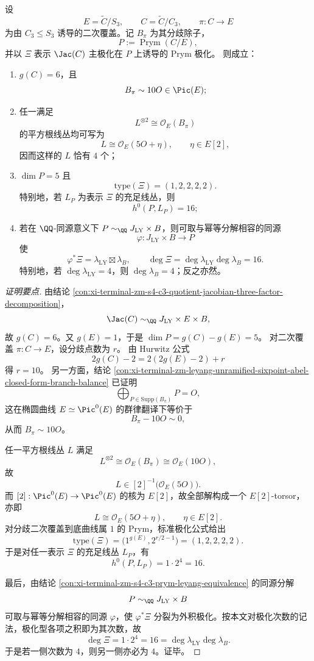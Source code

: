 \begin{conclusion}\label{con:xi-terminal-zm-prym-polarization-type-rigidity-11112}
设
\[
E=\widetilde{C}/S_3,\qquad
C=\widetilde{C}/C_3,\qquad
\pi:C\longrightarrow E
\]
为由 \(C_3\le S_3\) 诱导的二次覆盖。记 \(B_\pi\) 为其分歧除子，
\[
P:=\operatorname{Prym}(C/E),
\]
并以 \(\Xi\) 表示 \(\Jac(C)\) 主极化在 \(P\) 上诱导的 Prym 极化。
则成立：
\begin{enumerate}
  \item \(g(C)=6\)，且
  \[
  B_\pi\sim 10O\in \Pic(E);
  \]
  \item 任一满足
  \[
  L^{\otimes 2}\cong \mathcal O_E(B_\pi)
  \]
  的平方根线丛均可写为
  \[
  L\cong \mathcal O_E(5O+\eta),\qquad \eta\in E[2],
  \]
  因而这样的 \(L\) 恰有 \(4\) 个；
  \item \(\dim P=5\) 且
  \[
  \mathrm{type}(\Xi)=(1,2,2,2,2).
  \]
  特别地，若 \(L_P\) 为表示 \(\Xi\) 的充足线丛，则
  \[
  h^0(P,L_P)=16;
  \]
  \item 若在 \(\QQ\)-同源意义下 \(P\sim_{\QQ}J_{\mathrm{LY}}\times B\)，则可取与幂等分解相容的同源
  \[
  \varphi:J_{\mathrm{LY}}\times B\longrightarrow P
  \]
  使
  \[
  \varphi^*\Xi=\lambda_{\mathrm{LY}}\boxtimes \lambda_B,
  \qquad
  \deg\Xi=\deg\lambda_{\mathrm{LY}}\deg\lambda_B=16.
  \]
  特别地，若 \(\deg\lambda_{\mathrm{LY}}=4\)，则 \(\deg\lambda_B=4\)；反之亦然。
\end{enumerate}
\end{conclusion}
\begin{proof}[证明要点]
由结论 \ref{con:xi-terminal-zm-s4-c3-quotient-jacobian-three-factor-decomposition}，
\[
\Jac(C)\sim_{\QQ}J_{\mathrm{LY}}\times E\times B,
\]
故 \(g(C)=6\)。又 \(g(E)=1\)，于是 \(\dim P=g(C)-g(E)=5\)。
对二次覆盖 \(\pi:C\to E\)，设分歧点数为 \(r\)。
由 Hurwitz 公式
\[
2g(C)-2=2(2g(E)-2)+r
\]
得 \(r=10\)。
另一方面，结论 \ref{con:xi-terminal-zm-leyang-unramified-sixpoint-abel-closed-form-branch-balance} 已证明
\[
\bigoplus_{P\in\mathrm{Supp}(B_\pi)}P=O,
\]
这在椭圆曲线 \(E\simeq \Pic^0(E)\) 的群律翻译下等价于
\[
B_\pi-10O\sim 0,
\]
从而 \(B_\pi\sim 10O\)。

任一平方根线丛 \(L\) 满足
\[
L^{\otimes 2}\cong \mathcal O_E(B_\pi)\cong \mathcal O_E(10O),
\]
故
\[
L\in [2]^{-1}\!\bigl(\mathcal O_E(5O)\bigr).
\]
而 \([2]:\Pic^0(E)\to\Pic^0(E)\) 的核为 \(E[2]\)，故全部解构成一个 \(E[2]\)-torsor，亦即
\[
L\cong \mathcal O_E(5O+\eta),\qquad \eta\in E[2].
\]
对分歧二次覆盖到底曲线属 \(1\) 的 Prym，标准极化公式给出
\[
\mathrm{type}(\Xi)=\bigl(1^{g(E)},2^{r/2-1}\bigr)=(1,2,2,2,2).
\]
于是对任一表示 \(\Xi\) 的充足线丛 \(L_P\)，有
\[
h^0(P,L_P)=1\cdot 2^4=16.
\]

最后，由结论 \ref{con:xi-terminal-zm-s4-c3-prym-leyang-equivalence} 的同源分解
\[
P\sim_{\QQ}J_{\mathrm{LY}}\times B
\]
可取与幂等分解相容的同源 \(\varphi\)，使 \(\varphi^*\Xi\) 分裂为外积极化。按本文对极化次数的记法，极化型各项之积即为其次数，故
\[
\deg\Xi=1\cdot 2^4=16=\deg\lambda_{\mathrm{LY}}\deg\lambda_B.
\]
于是若一侧次数为 \(4\)，则另一侧亦必为 \(4\)。证毕。
\end{proof}


